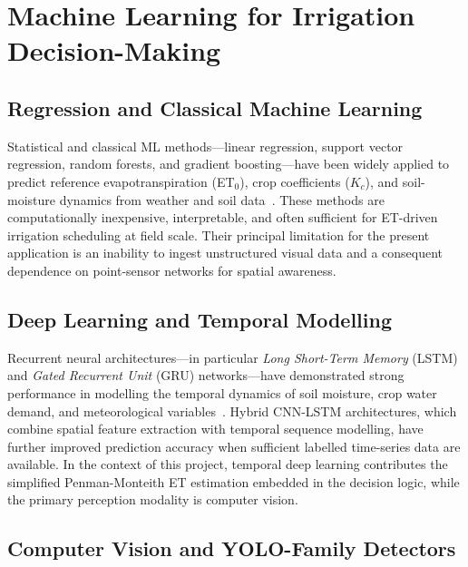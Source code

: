 \documentclass[12pt,a4paper]{report}
\newcommand{\abbr}[2]{\emph{#1} (#2)}
\begin{document}
\section{Machine Learning for Irrigation Decision-Making}

\subsection{Regression and Classical Machine Learning}

Statistical and classical ML methods---linear regression, support vector regression, random forests, and gradient boosting---have been widely applied to predict reference evapotranspiration (ET$_0$), crop coefficients ($K_c$), and soil-moisture dynamics from weather and soil data~\cite{Kamilaris2018}. These methods are computationally inexpensive, interpretable, and often sufficient for ET-driven irrigation scheduling at field scale. Their principal limitation for the present application is an inability to ingest unstructured visual data and a consequent dependence on point-sensor networks for spatial awareness.

\subsection{Deep Learning and Temporal Modelling}

Recurrent neural architectures---in particular \abbr{Long Short-Term Memory}{LSTM} and \abbr{Gated Recurrent Unit}{GRU} networks---have demonstrated strong performance in modelling the temporal dynamics of soil moisture, crop water demand, and meteorological variables~\cite{Kamilaris2018}. Hybrid CNN-LSTM architectures, which combine spatial feature extraction with temporal sequence modelling, have further improved prediction accuracy when sufficient labelled time-series data are available. In the context of this project, temporal deep learning contributes the simplified Penman-Monteith ET estimation embedded in the decision logic, while the primary perception modality is computer vision.

\subsection{Computer Vision and YOLO-Family Detectors}
\label{subsec:yolo_background}
\end{document}
